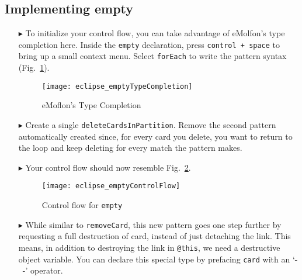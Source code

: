 \newpage
\subsection{Implementing empty}
\texHeader
\hypertarget{emptyPartition tex}{}

\texttt{}
\emph{}

\begin{itemize}
 
\item[$\blacktriangleright$] To initialize your control flow, you can take advantage of eMolfon's type completion here. Inside the \texttt{empty}
declaration, press  \texttt{control + space} to bring up a small context menu. Select \texttt{forEach} to write the pattern syntax
(Fig.~\ref{fig:typeCompletion}).

\vspace{0.5cm}

\begin{figure}[htpb]
\begin{center}
  \texttt{[image: eclipse\_emptyTypeCompletion]}
  \caption{eMoflon's Type Completion}
  \label{fig:typeCompletion}
\end{center}
\end{figure}

\vspace{0.5cm}

\item[$\blacktriangleright$] Create a single \texttt{deleteCardsInPartition}. Remove the second pattern automatically created since, for every card you delete,
you want to return to the loop and keep deleting for every match the pattern makes.

\vspace{0.5cm}

\item[$\blacktriangleright$] Your control flow should now resemble Fig.~\ref{fig:emptyControlFlow}.

\clearpage

\begin{figure}[htpb]
\begin{center}
  \texttt{[image: eclipse\_emptyControlFlow]}
  \caption{Control flow for \texttt{empty}}
  \label{fig:emptyControlFlow}
\end{center}
\end{figure}

\item[$\blacktriangleright$] While similar to \texttt{removeCard}, this new pattern goes one step further by requesting a full destruction of card, instead of
just detaching the link. This means, in addition to destroying the link in \texttt{@this}, we need a destructive object variable. You can declare this special
type by prefacing \texttt{card} with an `-~-' operator.


\end{itemize}
